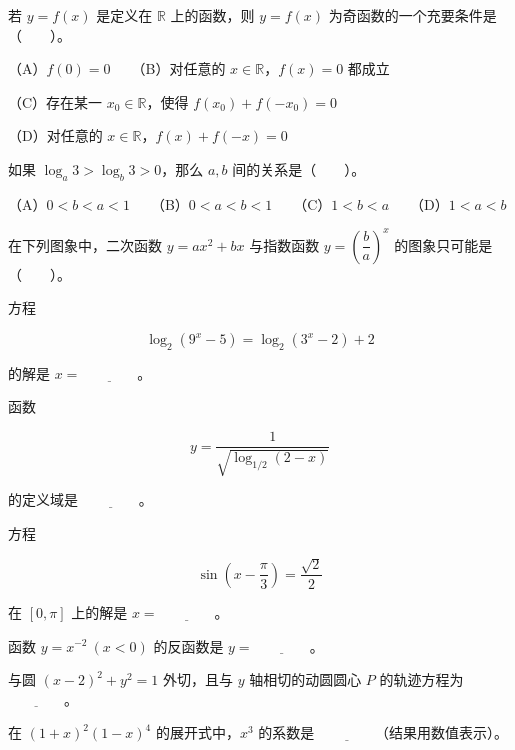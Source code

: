 \begin{question}
若 $y=f(x)$ 是定义在 $\mathbb R$ 上的函数，则 $y=f(x)$ 为奇函数的一个充要条件是\mbox{（　　）}。

（A）$f(0)=0$　　（B）对任意的 $x\in\mathbb R$，$f(x)=0$ 都成立

（C）存在某一 $x_0\in\mathbb R$，使得 $f(x_0)+f(-x_0)=0$

（D）对任意的 $x\in\mathbb R$，$f(x)+f(-x)=0$

\end{question}
\begin{question}
如果 $\log_a3>\log_b3>0$，那么 $a,b$ 间的关系是\mbox{（　　）}。

（A）$0<b<a<1$　　（B）$0<a<b<1$　　（C）$1<b<a$　　（D）$1<a<b$

\Needspace{0.4\textheight}
\end{question}
\begin{question}
在下列图象中，二次函数 $y=ax^2+bx$ 与指数函数 $y=\left(\dfrac{b}{a}\right)^x$ 的图象只可能是\mbox{（　　）}。
\nopagebreak[4]
\begin{center}\end{center}
\nopagebreak[4]
\end{question}
\begin{question}
方程

\nopagebreak[4]
\[
\log_2(9^x-5)=\log_2(3^x-2)+2
\]

的解是 $x=\underline{\qquad\qquad}$。

\end{question}
\begin{question}
函数

\nopagebreak[4]
\[
y=\dfrac{1}{\sqrt{\log_{1/2}(2-x)}}
\]

的定义域是 $\underline{\qquad\qquad}$。

\end{question}
\begin{question}
方程

\nopagebreak[4]
\[
\sin\left(x-\dfrac{\pi}{3}\right)=\dfrac{\sqrt{2}}{2}
\]

在 $[0,\pi]$ 上的解是 $x=\underline{\qquad\qquad}$。

\end{question}
\begin{question}
函数 $y=x^{-2}\ (x<0)$ 的反函数是 $y=\underline{\qquad\qquad}$。

\end{question}
\begin{question}
与圆 $(x-2)^2+y^2=1$ 外切，且与 $y$ 轴相切的动圆圆心 $P$ 的轨迹方程为 $\underline{\qquad\qquad}$。

\end{question}
\begin{question}
在 $(1+x)^2(1-x)^4$ 的展开式中，$x^3$ 的系数是 $\underline{\qquad\qquad}$（结果用数值表示）。

\end{question}

